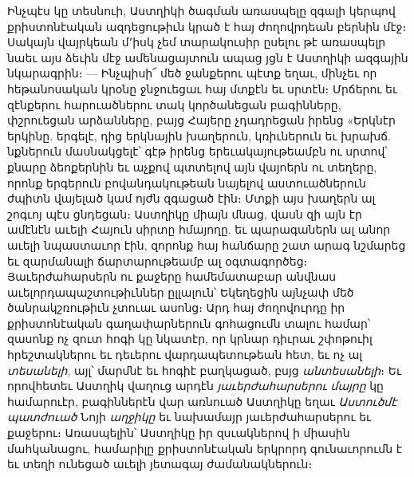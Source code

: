 \documentclass{article}
\begin{document}
{Ինչպէս կը տեսնուի, Աստղիկի ծագման առասպելը զգալի կերպով քրիստոնէական ազդեցութիւն կրած է հայ ժողովրդեան բերնին մէջ։ Սակայն վայրկեան մ՚իսկ չեմ տարակուսիր ըսելու թէ առասպելր նաեւ այս ձեւին մէջ ամենացայտուն ապաց յցն է Աստղիկի ազգային նկարագրին։ — Ինչպիսի՜ մեծ ջանքերու պէտք եղաւ, մինչեւ որ հեթանոսական կրօնը ջնջուեցաւ հայ մտքէն եւ սրտէն։ Մրճերու եւ զէնքերու հարուածներու տակ կործանեցան բագինները, փշրուեցան արձանները, բայց Հայերը չդադրեցան իրենց «Երկնէր երկինը. երգելէ, դից երկնային խաղերուն, կռիւներուն եւ խրախճ. նքներուն մասնակցելէ՝ գէթ իրենց երեւակայութեամբն ու սրտով՝ քնարը ձեոքերնին եւ աչքով պտտելով այն վայոերն ու տեղերը, որոնք երգերուն բովանդակութեան նայելով աստուածներուն ժպիտն վայելած կամ ոյժն զգացած էին։ Մտքի այս խաղերն ալ շոգւոյ պէս ցնդեցան։ Աստղիկը միայն մնաց, վասն զի այն էր ամէնէն աւելի Հայուն սիրտը հմայողը. եւ պարագաներն ալ անոր աւելի նպաստաւոր էին, զորոնք հայ հանճարը շատ արագ նշմարեց եւ զարմանալի ճարտարութեամբ ալ օգտագործեց։ Յաւերժահարսերն ու քաջերը համեմատաբար անվնաս աւելորդապաշտութիւններ ըլլալուն՝ Եկեղեցին այնչափ մեծ ծանրակշռութիւն չտուաւ ասոնց։ Արդ հայ ժողովուրդը իր քրիստոնէական գաղափարներուն գոհացումն տալու համար՝ զասոնք ոչ զուտ հոգի կը նկատէր, որ կրնար դիւրաւ շփոթուիլ հրեշտակներու եւ դեւերու վարդապետութեան հետ, եւ ոչ ալ \emph{տեսանելի}, այլ՝ մարմնէ եւ հոգիէ բաղկացած, բսյց \emph{անտեսանելի}։ Եւ որովհետեւ Աստղիկ վաղուց արդէն \emph{յաւերժահարսերու մայրը} կը համարուէր, բագիններէն վար առնուած Աստղիկը եղաւ \emph{Աստուծմէ պատժուած} Նոյի \emph{աղջիկը} եւ նախամայր յաւերժահարսերու եւ քաջերու։ Առասպելին՝ Աստղիկը իր զսւակներով ի միասին մահկանացու, համարիլը քրիստոնէական երկրորդ գունաւորումն է եւ տեղի ունեցած աւելի յետագայ ժամանակներուն։

}
\end{document}
